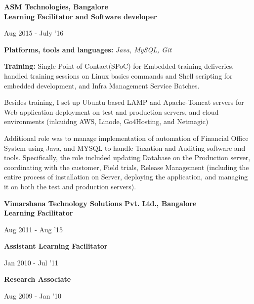 \documentclass[10pt]{article}
\newenvironment{innerlist}[1][\enskip\textbullet]%
        {\begin{compactitem}[#1]}{\end{compactitem}}
\begin{document}
\textbf{ASM Technologies, Bangalore} \\ \textbf{Learning Facilitator and Software developer} \\                      
\vspace*{-34pt} \begin{flushright} {Aug 2015 - July '16} \end{flushright}
\vspace*{-1pt} 
\textbf{Platforms, tools and languages:} \emph{Java, MySQL, Git}
\vspace*{2pt}
\begin{innerlist}
\item \textbf{Training:} Single Point of Contact(SPoC) for Embedded training deliveries, handled training sessions on Linux basics commands and Shell scripting for embedded development, and Infra Management Service Batches.
\item	Besides training, I set up Ubuntu based LAMP and Apache-Tomcat servers for Web application deployment on test and production servers, and cloud environments (inlcuidng AWS, Linode, Go4Hosting, and Netmagic)
\item	Additional role was to manage implementation of automation of Financial Office System using Java, and MYSQL to handle Taxation and Auditing software and tools.
\subitem	Specifically, the role included updating Database on the Production server, coordinating with the customer, Field trials, Release Management (including the entire process of installation on Server, deploying the application, and managing it on both the test and production servers).
\end{innerlist}  \vspace*{8pt}

\textbf{Vimarshana Technology Solutions Pvt. Ltd., Bangalore} \\ \textbf{Learning Facilitator} \\ 
\vspace{-35pt} \begin{flushright} {Aug 2011 - Aug '15} \end{flushright}
\textbf{Assistant Learning Facilitator} \\
\vspace*{-36pt} \begin{flushright} {Jan 2010 -    Jul '11} \end{flushright}
\textbf{Research Associate} \\
\vspace*{-35pt} \begin{flushright} {Aug 2009 -   Jan '10} \end{flushright}
\vspace*{3pt}
\end{document}
